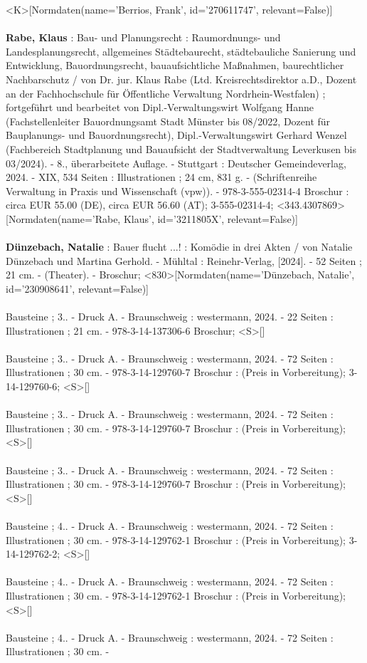 \documentclass{article}
\begin{document}
\begin{multicols}{3}
<K>[Normdaten(name='Berrios, Frank', id='270611747', relevant=False)]\\\\\textbf{Rabe, Klaus} : Bau- und Planungsrecht : Raumordnungs- und Landesplanungsrecht, allgemeines Städtebaurecht, städtebauliche Sanierung und Entwicklung, Bauordnungsrecht, bauaufsichtliche Maßnahmen, baurechtlicher Nachbarschutz / von Dr. jur. Klaus Rabe (Ltd. Kreisrechtsdirektor a.D., Dozent an der Fachhochschule für Öffentliche Verwaltung Nordrhein-Westfalen) ; fortgeführt und bearbeitet von Dipl.-Verwaltungswirt Wolfgang Hanne (Fachstellenleiter Bauordnungsamt Stadt Münster bis 08/2022, Dozent für Bauplanungs- und Bauordnungsrecht), Dipl.-Verwaltungswirt Gerhard Wenzel (Fachbereich Stadtplanung und Bauaufsicht der Stadtverwaltung Leverkusen bis 03/2024). - 8., überarbeitete Auflage. - Stuttgart : Deutscher Gemeindeverlag, 2024. - XIX, 534 Seiten : Illustrationen ; 24 cm, 831 g. - (Schriftenreihe Verwaltung in Praxis und Wissenschaft (vpw)). - 978-3-555-02314-4 Broschur : circa EUR 55.00 (DE), circa EUR 56.60 (AT); 3-555-02314-4; <343.4307869>[Normdaten(name='Rabe, Klaus', id='3211805X', relevant=False)]\\\\\textbf{Dünzebach, Natalie} : Bauer flucht ...! : Komödie in drei Akten / von Natalie Dünzebach und Martina Gerhold. - Mühltal : Reinehr-Verlag, [2024]. - 52 Seiten ; 21 cm. - (Theater). - Broschur; <830>[Normdaten(name='Dünzebach, Natalie', id='230908641', relevant=False)]\\\\Bausteine ; 3.. - Druck A. - Braunschweig : westermann, 2024. - 22 Seiten : Illustrationen ; 21 cm. - 978-3-14-137306-6 Broschur; <S>[]\\\\Bausteine ; 3.. - Druck A. - Braunschweig : westermann, 2024. - 72 Seiten : Illustrationen ; 30 cm. - 978-3-14-129760-7 Broschur : (Preis in Vorbereitung); 3-14-129760-6; <S>[]\\\\Bausteine ; 3.. - Druck A. - Braunschweig : westermann, 2024. - 72 Seiten : Illustrationen ; 30 cm. - 978-3-14-129760-7 Broschur : (Preis in Vorbereitung); <S>[]\\\\Bausteine ; 3.. - Druck A. - Braunschweig : westermann, 2024. - 72 Seiten : Illustrationen ; 30 cm. - 978-3-14-129760-7 Broschur : (Preis in Vorbereitung); <S>[]\\\\Bausteine ; 4.. - Druck A. - Braunschweig : westermann, 2024. - 72 Seiten : Illustrationen ; 30 cm. - 978-3-14-129762-1 Broschur : (Preis in Vorbereitung); 3-14-129762-2; <S>[]\\\\Bausteine ; 4.. - Druck A. - Braunschweig : westermann, 2024. - 72 Seiten : Illustrationen ; 30 cm. - 978-3-14-129762-1 Broschur : (Preis in Vorbereitung); <S>[]\\\\Bausteine ; 4.. - Druck A. - Braunschweig : westermann, 2024. - 72 Seiten : Illustrationen ; 30 cm. - 
\end{multicols}
\end{document}
